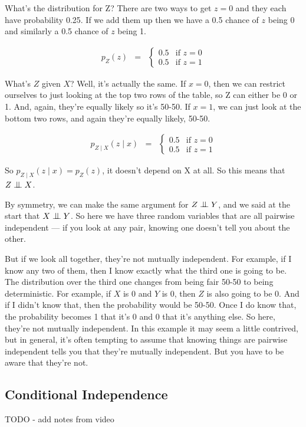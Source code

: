 \documentclass[6008notes.tex]{subfiles}
\begin{document}
What's the distribution for Z? There are two ways to get $z=0$ and they each have probability 0.25. If we add them up then we have a 0.5 chance of $z$ being 0 and similarly a 0.5 chance of $z$ being 1. 

\begin{eqnarray*}
p_Z(z)
&=&
\begin{cases}
  0.5 & \text{if }z=0 \\
  0.5 & \text{if }z=1
\end{cases}
\end{eqnarray*}

What's $Z$ given $X$? Well, it's actually the same. If $x=0$, then we can restrict ourselves to just looking at the top two rows of the table, so Z can either be 0 or 1. And, again, they're equally likely so it's 50-50. If $x=1$, we can just look at the bottom two rows, and again they're equally likely, 50-50. 

\begin{eqnarray*}
p_{Z \mid X}(z \mid x)
&=&
\begin{cases}
  0.5 & \text{if }z=0 \\
  0.5 & \text{if }z=1
\end{cases}
\end{eqnarray*}

So $p_{Z \mid X}(z \mid x) = p_Z(z)$, it doesn't depend on X at all. So this means that $Z \bigCI X$.

By symmetry, we can make the same argument for $Z \bigCI Y$, and we said at the start that $X \bigCI Y$. So here we have three random variables that are all pairwise independent --- if you look at any pair, knowing one doesn't tell you about the other. 

But if we look all together, they're not mutually independent. For example, if I know any two of them, then I know exactly what the third one is going to be. The distribution over the third one changes from being fair 50-50 to being deterministic. For example, if $X$ is 0 and $Y$ is 0, then $Z$ is also going to be 0. And if I didn't know that, then the probability would be 50-50. Once I do know that, the probability becomes 1 that it's 0 and 0 that it's anything else. So here, they're not mutually independent. In this example it may seem a little contrived, but in general, it's often tempting to assume that knowing things are pairwise independent tells you that they're mutually independent. But you have to be aware that they're not.

\subsection{Conditional Independence}

TODO - add notes from video
\end{document}
